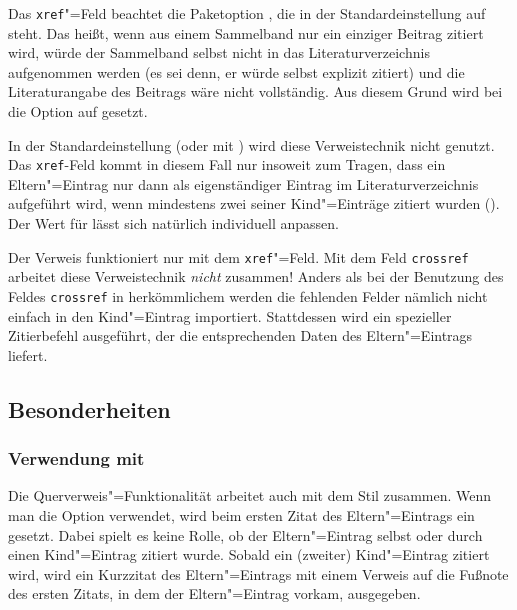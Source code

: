 \documentclass[ngerman]{scrartcl}
\begin{document}
Das \texttt{xref}"=Feld beachtet die Paketoption , 
die in der Standardeinstellung auf  steht. Das heißt, wenn aus einem
Sammelband nur ein einziger Beitrag zitiert wird, würde der Sammelband selbst nicht in das
Literaturverzeichnis aufgenommen werden (es sei denn, er würde selbst explizit 
zitiert) und die Literaturangabe des Beitrags wäre nicht vollständig. Aus diesem Grund
wird bei  die Option  auf  gesetzt.

In der Standardeinstellung (oder mit ) wird diese Verweistechnik 
nicht genutzt. Das \texttt{xref}-Feld kommt in diesem Fall nur insoweit zum Tragen, dass ein
Eltern"=Eintrag nur dann als eigenständiger Eintrag im Literaturverzeichnis aufgeführt 
wird, wenn mindestens zwei seiner Kind"=Einträge zitiert wurden ().
Der Wert für  lässt sich natürlich individuell anpassen.

\achtung{}Der Verweis funktioniert nur mit dem \texttt{xref}"=Feld. Mit dem Feld 
\texttt{crossref} arbeitet diese Verweistechnik \emph{nicht} zusammen! Anders als 
bei der Benutzung des Feldes \texttt{crossref} in herkömmlichem \BibTeX{} 
werden die fehlenden Felder nämlich nicht einfach in den Kind"=Eintrag importiert. 
Stattdessen wird ein spezieller Zitierbefehl ausgeführt, der die entsprechenden 
Daten des Eltern"=Eintrags liefert.

\subsection{Besonderheiten}
\subsubsection{Verwendung mit }
Die Querverweis"=Funktionalität arbeitet auch mit dem Stil  zusammen. 
Wenn man die Option  verwendet, wird beim ersten Zitat des
Eltern"=Eintrags ein  gesetzt. Dabei spielt es keine Rolle, ob der 
Eltern"=Eintrag selbst oder durch einen Kind"=Eintrag zitiert wurde. Sobald ein
(zweiter) Kind"=Eintrag zitiert wird, wird ein Kurzzitat des Eltern"=Eintrags mit einem Verweis 
auf die Fußnote des ersten Zitats, in dem der Eltern"=Eintrag vorkam, ausgegeben.
\end{document}

